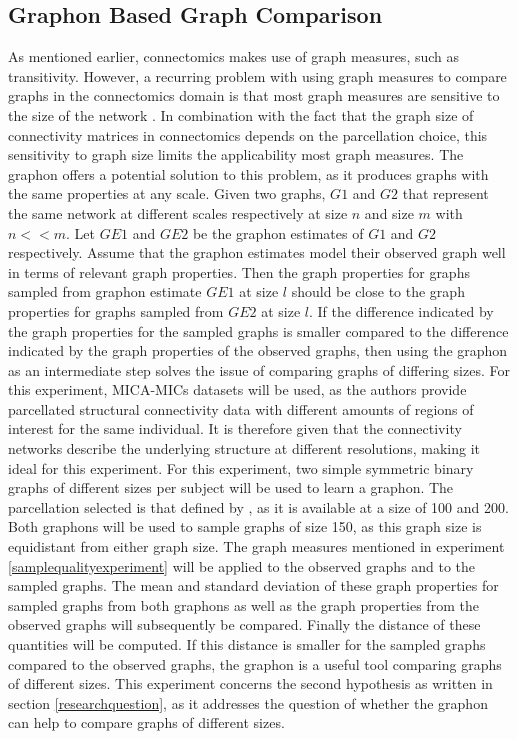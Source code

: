 \documentclass[11pt]{report} %
\begin{document}
\subsection{Graphon Based Graph Comparison}
As mentioned earlier, connectomics makes use of graph measures, such as transitivity. 
However, a recurring problem with using graph measures to compare graphs in the connectomics domain is that most graph measures are sensitive to the size of the network \cite{vanwijk2010}. 
In combination with the fact that the graph size of connectivity matrices in connectomics depends on the parcellation choice, this sensitivity to graph size limits the applicability most graph measures.
The graphon offers a potential solution to this problem, as it produces graphs with the same properties at any scale.
Given two graphs, $G1$ and $G2$ that represent the same network at different scales respectively at size $n$ and size $m$ with $n<<m$.
Let $GE1$ and $GE2$ be the graphon estimates of $G1$ and $G2$ respectively.
Assume that the graphon estimates model their observed graph well in terms of relevant graph properties.
Then the graph properties for graphs sampled from graphon estimate $GE1$ at size $l$ should be close to the graph properties for graphs sampled from $GE2$ at size $l$.
If the difference indicated by the graph properties for the sampled graphs is smaller compared to the difference indicated by the graph properties of the observed graphs, then using the graphon as an intermediate step solves the issue of comparing graphs of differing sizes.
For this experiment, MICA-MICs datasets will be used, as the authors provide parcellated structural connectivity data with different amounts of regions of interest for the same individual.
It is therefore given that the connectivity networks describe the underlying structure at different resolutions, making it ideal for this experiment.
For this experiment, two simple symmetric binary graphs of different sizes per subject will be used to learn a graphon.
The parcellation selected is that defined by , as it is available at a size of 100 and 200.
Both graphons will be used to sample graphs of size 150, as this graph size is equidistant from either graph size.
The graph measures mentioned in experiment \ref{samplequalityexperiment} will be applied to the observed graphs and to the sampled graphs.
The mean and standard deviation of these graph properties for sampled graphs from both graphons as well as the graph properties from the observed graphs will subsequently be compared.
Finally the distance of these quantities will be computed. 
If this distance is smaller for the sampled graphs compared to the observed graphs, the graphon is a useful tool comparing graphs of different sizes.
This experiment concerns the second hypothesis as written in section \ref{researchquestion}, as it addresses the question of whether the graphon can help to compare graphs of different sizes.
\end{document}
